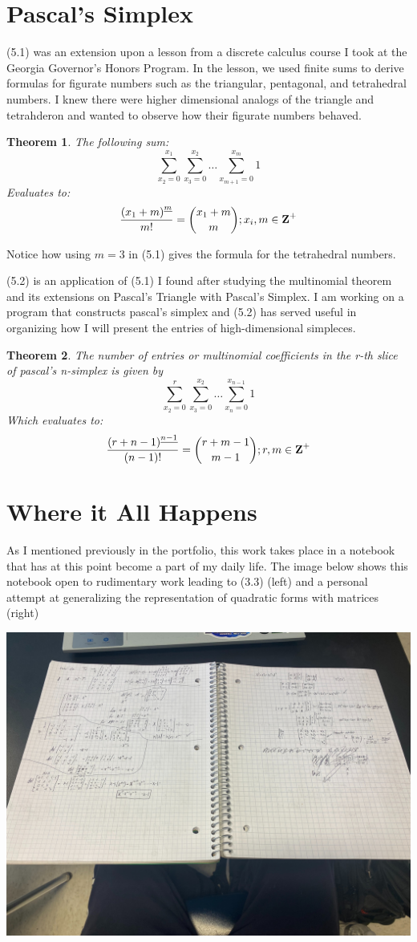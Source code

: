 \documentclass[11pt]{article}
\newtheorem{theorem}{Theorem}[section]
\begin{document}
\section{Pascal's Simplex}

(5.1) was an extension upon a lesson from a discrete calculus course I took at the Georgia Governor's Honors Program. In the lesson, we used finite sums to derive formulas for figurate numbers such as the triangular, pentagonal, and tetrahedral numbers. I knew there were higher dimensional analogs of the triangle and tetrahderon and wanted to observe how their figurate numbers behaved.

\begin{theorem}
    The following sum:
    $$\sum_{x_2 = 0}^{x_1}\sum_{x_3 = 0}^{x_2}\dots\sum_{x_{m+1} = 0}^{x_m}1$$
    Evaluates to:
    $$\frac{{(x_1+m)}^{\underline{m}}}{m!}={{x_1+m} \choose {m}};x_i,m\in\mbox{\textbf{Z}}^+$$
\end{theorem}

Notice how using $m=3$ in (5.1) gives the formula for the tetrahedral numbers.

(5.2) is an application of (5.1) I found after studying the multinomial theorem and its extensions on Pascal's Triangle with Pascal's Simplex. I am working on a program that constructs pascal's simplex and (5.2) has served useful in organizing how I will present the entries of high-dimensional simpleces.

\begin{theorem}
    The number of entries or multinomial coefficients in the r-th slice of pascal's n-simplex is given by 
    $$\sum_{x_2 = 0}^{r}\sum_{x_3 = 0}^{x_2}\dots\sum_{x_{n} = 0}^{x_{n-1}}1$$
    Which evaluates to:
    $$\frac{{(r+n-1)}^{\underline{n-1}}}{(n-1)!}={{r+m-1} \choose {m-1}};r,m\in\mbox{\textbf{Z}}^+$$
\end{theorem}

\section{Where it All Happens}
As I mentioned previously in the portfolio, this work takes place in a notebook that has at this point become a part of my daily life. The image below shows this notebook open to rudimentary work leading to (3.3) (left) and a personal attempt at generalizing the representation of quadratic forms with matrices (right)

\begin{center}
\includegraphics[scale=0.12]{image}
\end{center}
\end{document}
